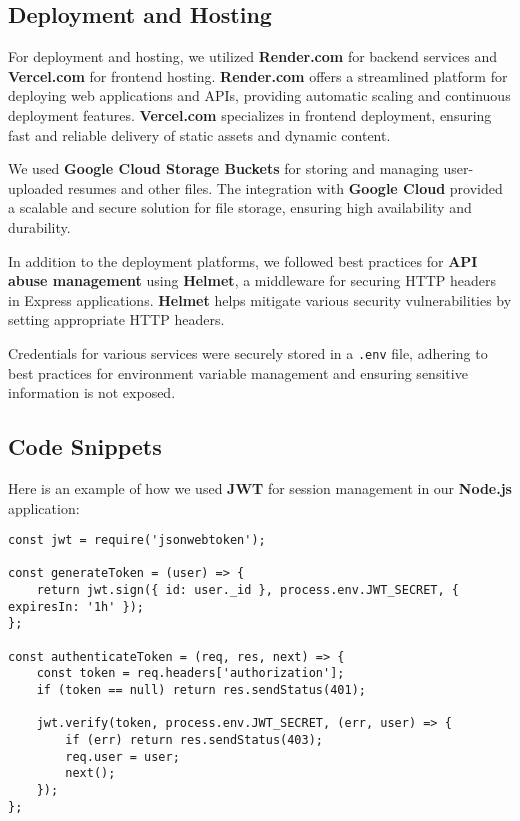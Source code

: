 \subsection{Deployment and Hosting}

For deployment and hosting, we utilized \textbf{Render.com} for backend services and \textbf{Vercel.com} for frontend hosting. \textbf{Render.com} offers a streamlined platform for deploying web applications and APIs, providing automatic scaling and continuous deployment features. \textbf{Vercel.com} specializes in frontend deployment, ensuring fast and reliable delivery of static assets and dynamic content.

We used \textbf{Google Cloud Storage Buckets} for storing and managing user-uploaded resumes and other files. The integration with \textbf{Google Cloud} provided a scalable and secure solution for file storage, ensuring high availability and durability.


In addition to the deployment platforms, we followed best practices for \textbf{API abuse management} using \textbf{Helmet}, a middleware for securing HTTP headers in Express applications. \textbf{Helmet} helps mitigate various security vulnerabilities by setting appropriate HTTP headers.

Credentials for various services were securely stored in a \texttt{.env} file, adhering to best practices for environment variable management and ensuring sensitive information is not exposed.

\subsection{Code Snippets}

Here is an example of how we used \textbf{JWT} for session management in our \textbf{Node.js} application:

\begin{verbatim}
const jwt = require('jsonwebtoken');

const generateToken = (user) => {
    return jwt.sign({ id: user._id }, process.env.JWT_SECRET, { expiresIn: '1h' });
};

const authenticateToken = (req, res, next) => {
    const token = req.headers['authorization'];
    if (token == null) return res.sendStatus(401);

    jwt.verify(token, process.env.JWT_SECRET, (err, user) => {
        if (err) return res.sendStatus(403);
        req.user = user;
        next();
    });
};
\end{verbatim}

